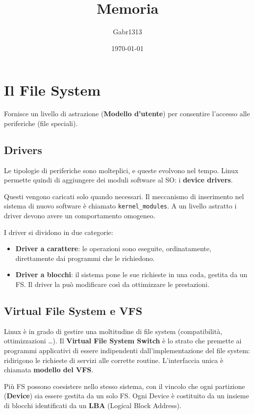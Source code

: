 \documentclass[12pt, a4paper]{report}
\title{Memoria}
\author{Gabr1313}
\date{\today}
\begin{document}
\justify
\sloppy
\maketitle
\tableofcontents

\chapter{Il File System}
Fornisce un livello di astrazione (\textbf{Modello d'utente}) per consentire
l'accesso alle periferiche (file speciali).
\section{Drivers}
Le tipologie di periferiche sono molteplici, e queste evolvono nel tempo. Linux
permette quindi di aggiungere dei moduli software al SO: i \textbf{device
drivers}.

Questi vengono caricati solo quando necessari. Il meccanismo di inserimento nel
sistema di nuovo software è chiamato \texttt{kernel\_modules}. A un livello
astratto i driver devono avere un comportamento omogeneo.

I driver si dividono in due categorie:
\begin{itemize}
	\item \textbf{Driver a carattere}: le operazioni sono eseguite,
		ordinatamente, direttamente dai programmi che le richiedono.
	\item \textbf{Driver a blocchi}: il sistema pone le sue richieste in una
		coda, gestita da un FS. Il driver la può modificare così da ottimizzare
		le prestazioni. \end{itemize}

\section{Virtual File System e VFS}
Linux è in grado di gestire una moltitudine di file system (compatibilità,
ottimizzazioni \dots). Il \textbf{Virtual File System Switch} è lo strato che
premette ai programmi applicativi di essere indipendenti dall'implementazione
del file system: ridirigono le richieste di servizi alle corrette routine.
L'interfaccia unica è chiamata \textbf{modello del VFS}.

Più FS possono coesistere nello stesso sistema, con il vincolo che ogni
partizione (\textbf{Device}) sia essere gestita da un solo FS. Ogni Device è
costituito da un insieme di blocchi identificati da un \textbf{LBA} (Logical
Block Address).
\end{document}
